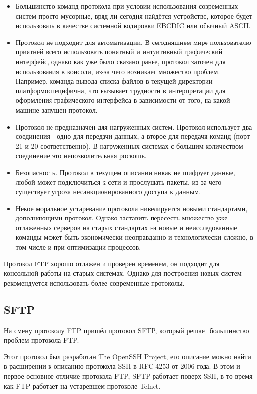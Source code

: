 \documentclass[a4paper,14pt]{extarticle}
\begin{document}
\begin{itemize}
\item Большинство команд протокола при условии использования современных систем 
просто мусорные, вряд ли сегодня найдётся устройство, которое будет использовать
в качестве системной кодировки EBCDIC или обычный ASCII.
\item Протокол не подходит для автоматизации. В сегодняшнем мире пользователю
приятней всего использовать понятный и интуитивный графический интерфейс, однако
как уже было сказано ранее, протокол заточен для использования в консоли, из-за
чего возникает множество проблем. Например, команда вывода списка файлов в текущей директории
платформоспецифична, что вызывает трудности в интерпретации для оформления графического интерфейса
в зависимости от того, на какой машине запущен протокол.
\item Протокол не предназначен для нагруженных систем. Протокол использует два соединения - 
одно для передачи данных, а второе для передачи команд (порт 21 и 20 соответственно). 
В нагруженных системах с большим количеством соединение это непозволительная роскошь.
\item Безопасность. Протокол в текущем описании никак не шифрует данные, любой может
подключиться к сети и прослушать пакеты, из-за чего существует угроза несанкционированного
доступа к данным.  
\item Некое моральное устаревание протокола нивелируется новыми стандартами, дополняющими 
протокол. Однако заставить пересесть множество уже отлаженных серверов на старых стандартах
на новые и неисследованные команды может быть экономически неоправданно и технологически сложно, 
в том числе и при оптимизации процессов.
\end{itemize}

Протокол FTP хорошо отлажен и проверен временем, он подходит для консольной работы
на старых системах. Однако для построения новых систем рекомендуется использовать 
более современные протоколы.

\subsection{SFTP}

На смену протоколу FTP пришёл протокол SFTP, который решает большинство проблем протокола FTP. 

Этот протокол был разработан The OpenSSH Project, его описание можно 
найти в расширении к описанию протокола SSH в RFC-4253 от 2006 года. В этом и первое основное 
отличие протокола FTP, SFTP работает поверх SSH, в то время как FTP работает
на устаревшем протоколе Telnet.
\end{document}
